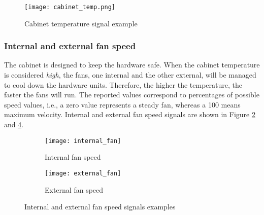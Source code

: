 \begin{figure}[H]
	\centering
	\texttt{[image: cabinet\_temp.png]}
	\caption{Cabinet temperature signal example}
	\label{fig:feats_cabinet_temp}
\end{figure}

\pagebreak
\subsubsection*{Internal and external fan speed}

The cabinet is designed to keep the hardware safe. When the cabinet temperature is considered \emph{high}, the fans, one internal and the other external, will be managed to cool down the hardware units. Therefore, the higher the temperature, the faster the fans will run. The reported values correspond to percentages of possible speed values, i.e.,  a zero value represents a steady fan, whereas a 100 means maximum velocity. Internal and external fan speed signals are shown in Figure \ref{fig:feats_int_fan} and \ref{fig:feats_ext_fan}.

\begin{figure}[hptb]
	\begin{subfigure}{.47\textwidth}
		\texttt{[image: internal\_fan]}
		\caption{Internal fan speed}
		\label{fig:feats_int_fan}
	\end{subfigure}%
	\hfill
	\begin{subfigure}{.47\textwidth}
		\texttt{[image: external\_fan]}
		\caption{External fan speed}
		\label{fig:feats_ext_fan}
	\end{subfigure}
	\caption{Internal and external fan speed signals examples}
\end{figure}

